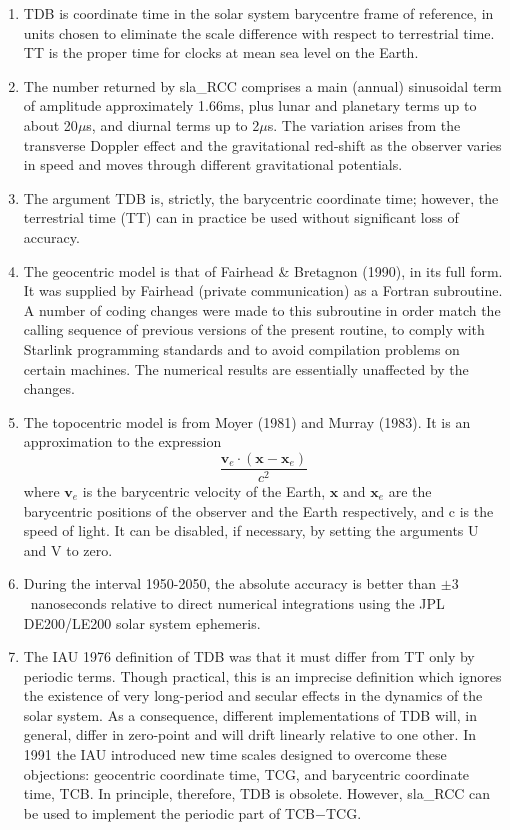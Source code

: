 \documentclass[11pt,twoside,nolof]{starlink}
\begin{document}
{
 \begin{enumerate}
  \item TDB is coordinate time in the solar system barycentre frame
        of reference, in units chosen to eliminate the scale difference
        with respect to terrestrial time.  TT is the proper
        time for clocks at mean sea level on the Earth.
  \item The number returned by sla\_RCC comprises
        a main (annual) sinusoidal term of amplitude
        approximately 1.66ms, plus lunar and planetary terms up to about
        20$\mu$s, and diurnal terms up to 2$\mu$s.  The
        variation arises from the transverse Doppler effect and the
        gravitational red-shift as the observer varies in speed and
        moves through different gravitational potentials.
  \item The argument TDB is, strictly, the barycentric coordinate time;
        however, the terrestrial time (TT) can in practice be used without
        significant loss of accuracy.
  \item The geocentric model is that of Fairhead \& Bretagnon (1990), in
        its full form.  It was supplied by Fairhead (private communication)
        as a Fortran subroutine.  A number of coding changes were made to
        this subroutine in order
        match the calling sequence of previous versions of the present
        routine, to comply with Starlink programming standards and to
        avoid compilation problems on certain machines.  The
        numerical results are essentially unaffected by the
        changes.
  \item The topocentric model is from Moyer (1981) and Murray (1983).
        It is an approximation to the expression
        \[\frac{\textbf{v}_e \cdot ( \textbf{x} - \textbf{x}_e )}{c^2}\]
        where $\textbf{v}_e$ is the barycentric velocity of
        the Earth, $\textbf{x}$ and $\textbf{x}_e$ are the barycentric positions
        of the observer and the Earth respectively, and
        c is the speed of light.
        It can be disabled, if necessary, by setting the arguments
        U and V to zero.
  \item During the interval 1950-2050, the absolute accuracy
        is better than $\pm3$~nanoseconds
        relative to direct numerical integrations using the JPL DE200/LE200
        solar system ephemeris.
  \item The IAU 1976 definition of TDB was that it must differ from TT only by
        periodic terms.  Though practical, this is an imprecise definition
        which ignores the existence of very long-period and secular effects
        in the dynamics of the solar system.  As a consequence, different
        implementations of TDB will, in general, differ in zero-point and
        will drift linearly relative to one other.  In 1991 the IAU introduced
        new time scales designed to overcome these objections:  geocentric coordinate
        time, TCG, and barycentric coordinate time, TCB.  In principle, therefore,
        TDB is obsolete.  However, sla\_RCC
        can be used to implement the periodic part of TCB$-$TCG.
 \end{enumerate}
}
\end{document}
